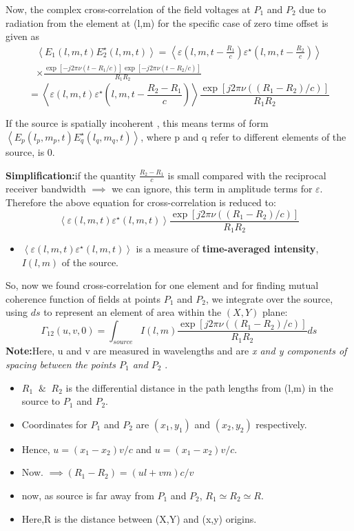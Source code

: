 \documentclass[10pt]{report}
\newcommand{\tit}[1]{\textit{#1}}
\newcommand{\cbox}{tcolorbox}
\newcommand{\cc}[1]{\left({#1}\right)}
\newcommand{\rr}[1]{\left[{#1}\right]}
\newcommand{\aab}[1]{\left\langle{#1}\right\rangle}
\begin{document}
Now, the complex cross-correlation of the field voltages at $P_1$ and $P_2$ due to radiation from the element at (l,m) for the specific case of zero time offset is given as 
\begin{eqnarray*}
\aab{E_1(l,m,t)E^\star_2(l,m,t)}=\aab{\varepsilon(l,m,t-\frac{R_1}{c})\varepsilon^\star(l,m,t-\frac{R_2}{c})}\\
\times \frac{\exp{\rr{-j2\pi\nu(t-R_1/c)}}\exp{\rr{-j2\pi\nu(t-R_2/c)}}}{R_1R_2}
\end{eqnarray*}
\begin{equation}
=\aab{\varepsilon(l,m,t)\varepsilon^\star(l,m,t-\frac{R_2-R_1}{c})}\frac{\exp{\rr{j2\pi\nu((R_1-R_2)/c)}}}{R_1R_2}
\end{equation}
\begin{\cbox}
If the source is spatially incoherent , this means terms of form $\aab{E_p(l_p,m_p,t)E^\star_q(l_q,m_q,t)}$, where p and q refer to different elements of the source, is 0.
\end{\cbox}
\textbf{Simplification:}if the quantity $\frac{R_2-R_1}{c}$ is small compared with the reciprocal receiver bandwidth $\implies$ we can ignore, this term  in amplitude terms for $\varepsilon$.\\
Therefore the above equation for cross-correlation is reduced to:
\begin{equation}
\aab{\varepsilon(l,m,t)\varepsilon^\star(l,m,t)}\frac{\exp{\rr{j2\pi\nu((R_1-R_2)/c)}}}{R_1R_2}
\end{equation}
\begin{itemize}
\item $\aab{\varepsilon(l,m,t)\varepsilon^\star(l,m,t)}$ is a measure of \textbf{time-averaged intensity}, $I(l,m)$ of the source. 
\end{itemize}
So, now we found cross-correlation for one element and for finding mutual coherence function of fields at points $P_1$ and $P_2$, we integrate over the source, using $ds$ to represent an element of area within the $\cc{X,Y}$ plane:
\begin{equation}\label{croscor}
\Gamma_{12}(u,v,0)=\int_{source} I(l,m)\frac{\exp{\rr{j2\pi\nu((R_1-R_2)/c)}}}{R_1R_2}ds
\end{equation}
\textbf{Note:}Here, u and v are measured in wavelengths and are \tit{x and y components of spacing between the points $P_1$ and $P_2$}
.
\begin{itemize}
\item $R_1 \;\; \& \;\; R_2$ is the differential distance in the path lengths from (l,m) in the source to $P_1$ and $P_2$.
\item Coordinates for $P_1$ and $P_2$ are $(x_1,y_1)$ and $(x_2,y_2)$ respectively.
\item Hence, $u=(x_1-x_2)v/c$ and $u=(x_1-x_2)v/c$.
\item Now. $\implies (R_1-R_2)=(ul+vm)c/v$
\item now, as source is far away from $P_1$ and $P_2$, $R_1\simeq R_2 \simeq R $.
\item Here,R is the distance between (X,Y) and (x,y) origins.
\end{itemize}
\end{document}
